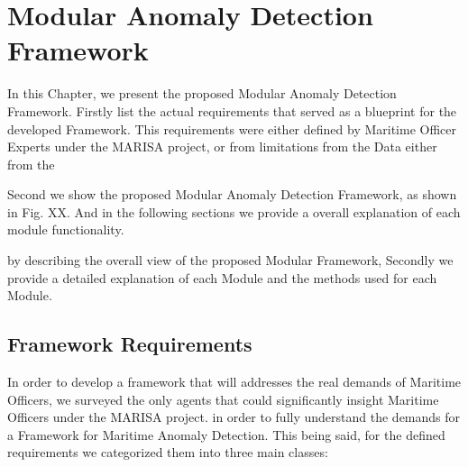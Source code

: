 \chapter{Modular Anomaly Detection Framework}
\label{chapter:Chapter 3}

In this Chapter, we present the proposed Modular Anomaly Detection Framework. Firstly list the actual requirements that served as a blueprint for the developed Framework. This requirements were either defined by Maritime Officer Experts under the MARISA project, or from limitations from the Data either from the  

Second we show the proposed Modular Anomaly Detection Framework, as shown in Fig. XX. And in the following sections we provide a overall explanation of each module functionality. 

by describing the overall view of the proposed Modular Framework, Secondly we provide a detailed explanation of each Module and the methods used for each Module. 

\section{Framework Requirements}
\label{section: Framework Requirements}
In order to develop a framework that will addresses the real demands of Maritime Officers, we surveyed the only agents that could significantly insight Maritime Officers under the MARISA project. in order to fully understand the demands for a Framework for Maritime Anomaly Detection.
This being said, for the defined requirements we categorized them into three main classes:

